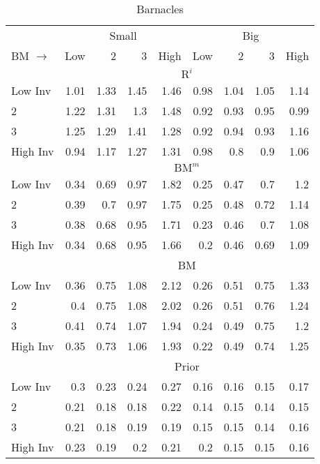 
\begin{table}[!ht]
\scriptsize
\centering
\caption{Barnacles}
\begin{tabular}{lrrrrrrrr}
  \toprule
     & \multicolumn{4}{c}{Small} & \multicolumn{4}{c}{Big}  \\
     \cmidrule(r){2-5} \cmidrule(r){6-9}
    BM $\rightarrow$ & Low & 2 & 3 & High & Low & 2 & 3 & High  \\ 
  \midrule
  
  
    & \multicolumn{8}{c}{$\text{R}^i$}  \\
     \cmidrule(r){2-5} \cmidrule(r){6-9}
    Low Inv  & 1.01  & 1.33  & 1.45  & 1.46  & 0.98  & 1.04  & 1.05  & 1.14   \\
    2  & 1.22  & 1.31  & 1.3  & 1.48  & 0.92  & 0.93  & 0.95  & 0.99   \\
    3  & 1.25  & 1.29  & 1.41  & 1.28  & 0.92  & 0.94  & 0.93  & 1.16   \\
    High Inv  & 0.94  & 1.17  & 1.27  & 1.31  & 0.98  & 0.8  & 0.9  & 1.06   \\
    
  
    & \multicolumn{8}{c}{$\text{BM}^m$}  \\
     \cmidrule(r){2-5} \cmidrule(r){6-9}
    Low Inv  & 0.34  & 0.69  & 0.97  & 1.82  & 0.25  & 0.47  & 0.7  & 1.2   \\
    2  & 0.39  & 0.7  & 0.97  & 1.75  & 0.25  & 0.48  & 0.72  & 1.14   \\
    3  & 0.38  & 0.68  & 0.95  & 1.71  & 0.23  & 0.46  & 0.7  & 1.08   \\
    High Inv  & 0.34  & 0.68  & 0.95  & 1.66  & 0.2  & 0.46  & 0.69  & 1.09   \\
    
  
    & \multicolumn{8}{c}{BM}  \\
     \cmidrule(r){2-5} \cmidrule(r){6-9}
    Low Inv  & 0.36  & 0.75  & 1.08  & 2.12  & 0.26  & 0.51  & 0.75  & 1.33   \\
    2  & 0.4  & 0.75  & 1.08  & 2.02  & 0.26  & 0.51  & 0.76  & 1.24   \\
    3  & 0.41  & 0.74  & 1.07  & 1.94  & 0.24  & 0.49  & 0.75  & 1.2   \\
    High Inv  & 0.35  & 0.73  & 1.06  & 1.93  & 0.22  & 0.49  & 0.74  & 1.25   \\
    
  
    & \multicolumn{8}{c}{Prior}  \\
     \cmidrule(r){2-5} \cmidrule(r){6-9}
    Low Inv  & 0.3  & 0.23  & 0.24  & 0.27  & 0.16  & 0.16  & 0.15  & 0.17   \\
    2  & 0.21  & 0.18  & 0.18  & 0.22  & 0.14  & 0.15  & 0.14  & 0.15   \\
    3  & 0.21  & 0.18  & 0.19  & 0.19  & 0.15  & 0.15  & 0.14  & 0.16   \\
    High Inv  & 0.23  & 0.19  & 0.2  & 0.21  & 0.2  & 0.15  & 0.15  & 0.16   \\
    

\end{tabular}
\end{table}
